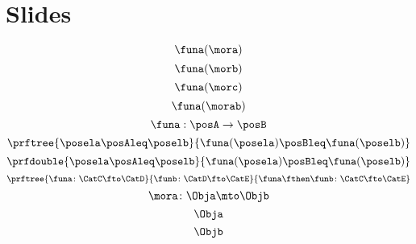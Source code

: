 
\section{Slides}

\begin{forslides}

    \begin{equation}
        \label{eq:slides_Ff}
        \funa(\mora)
    \end{equation}
    \begin{equation}
        \label{eq:slides_Fg}
        \funa(\morb)
    \end{equation}
    \begin{equation}
        \label{eq:slides_Fh}
        \funa(\morc)
    \end{equation}
    \begin{equation}
        \label{eq:slides_Ffg}
        \funa(\morab)
    \end{equation}
    \begin{equation}
        \label{eq:mono1}
        \funa: \posA \to \posB
    \end{equation}
    \begin{equation}
        \label{eq:mono2}
        \prftree{\posela \posAleq \poselb}{\funa(\posela) \posBleq \funa(\poselb)}
    \end{equation}
    \begin{equation}
        \label{eq:mono3}
        \prfdouble{\posela \posAleq \poselb}{\funa(\posela) \posBleq \funa(\poselb)}
    \end{equation}
    \begin{equation}
        \label{eq:functor-composition1}
        \prftree{\funa\colon \CatC \fto \CatD}{\funb\colon\CatD\fto\CatE}{\funa\fthen\funb\colon \CatC \fto \CatE}
    \end{equation}
    \begin{equation}
        \label{eq:slides_mora}
        \mora\colon \Obja\mto\Objb
    \end{equation}
    \begin{equation}
        \label{eq:slides_mora_obja}
        \Obja
    \end{equation}
    \begin{equation}
        \label{eq:slides_mora_objb}
        \Objb
    \end{equation}
    \begin{equation}
        \label{eq:slides_funa}

\end{equation}
\end{forslides}
